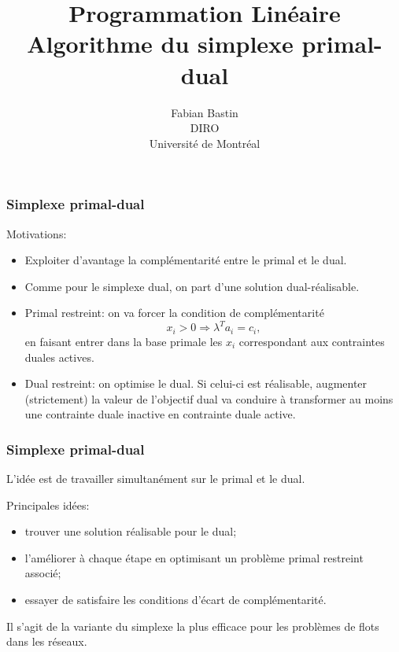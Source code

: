 \documentclass[t,usepdftitle=false]{beamer}
\title[Simplexe primal-dual]{Programmation Linéaire\\Algorithme du simplexe primal-dual}
\author[Fabian Bastin]{Fabian Bastin\\DIRO\\Université de Montréal}
\date{}
\begin{document}
\frame{\titlepage}

\begin{frame}
\frametitle{Simplexe primal-dual}

Motivations:
\begin{itemize}
\item
Exploiter d'avantage la complémentarité entre le primal et le dual.
\item
Comme pour le simplexe dual, on part d'une solution dual-réalisable.
\item
Primal restreint: on va forcer la condition de complémentarité
\[
x_i > 0 \Rightarrow \lambda^T a_i = c_i,
\]
en faisant entrer dans la base primale les $x_i$ correspondant aux contraintes duales actives.
\item
Dual restreint: on optimise le dual. Si celui-ci est réalisable, augmenter (strictement) la valeur de l'objectif dual va conduire à transformer au moins une contrainte duale inactive en contrainte duale active.
\end{itemize}

\end{frame}

\begin{frame}
\frametitle{Simplexe primal-dual}

L'idée est de travailler simultanément sur le primal et le dual.

\mbox{}

Principales idées:
\begin{itemize}
\item
trouver une solution réalisable pour le dual;
\item
l'améliorer à chaque étape en optimisant un problème primal restreint associé;
\item
essayer de satisfaire les conditions d'écart de complémentarité.
\end{itemize}

\mbox{}

Il s'agit de la variante du simplexe la plus efficace pour les problèmes de flots dans les réseaux.

\end{frame}
\end{document}
